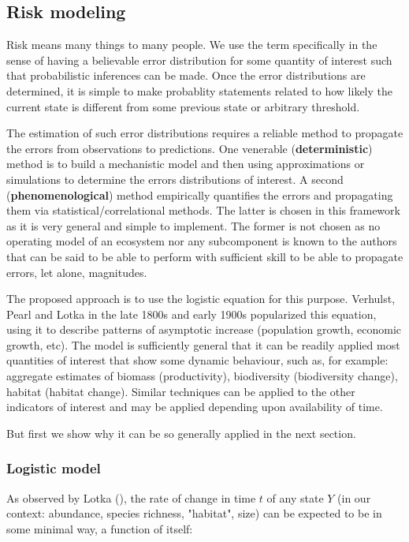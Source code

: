 \documentclass[letterpaper,portrait,11pt]{scrartcl}
\numberwithin{equation}{section}		%
\numberwithin{figure}{section}		%
\numberwithin{table}{section}				%
\begin{document}
\subsection{Risk modeling}
\label{sec:riskapproach}

Risk means many things to many people. We use the term specifically in the sense of having a believable error distribution for some quantity of interest such that probabilistic inferences can be made. Once the error distributions are determined, it is simple to make probablity statements related to how likely the current state is different from some previous state or arbitrary threshold. 

The estimation of such error distributions requires a reliable method to propagate the errors from observations to predictions. One venerable (\textbf{deterministic}) method is to build a mechanistic model and then using approximations or simulations to determine the errors distributions of interest. A second (\textbf{phenomenological}) method empirically quantifies the errors and propagating them via statistical/correlational methods. The latter is chosen in this framework as it is very general and simple to implement. The former is not chosen as no operating model of an ecosystem nor any subcomponent is known to the authors that can be said to be able to perform with sufficient skill to be able to propagate errors, let alone, magnitudes. 

The proposed approach is to use the logistic equation for this purpose. Verhulst, Pearl and Lotka in the late 1800s and early 1900s popularized this equation, using it to describe patterns of asymptotic increase (population growth, economic growth, etc). The model is sufficiently general that it can be readily applied most quantities of interest that show some dynamic behaviour, such as, for example: aggregate estimates of biomass (productivity), biodiversity (biodiversity change), habitat (habitat change). Similar techniques can be applied to the other indicators of interest and may be applied depending upon availability of time. 

But first we show why it can be so generally applied in the next section.


\subsubsection{Logistic model}

As observed by Lotka (\citeyear{lotka1925}), the rate of change in time $t$ of any state $Y$ (in our context: abundance, species richness, "habitat", size) can be expected to be in some minimal way, a function of itself:  
\end{document}
